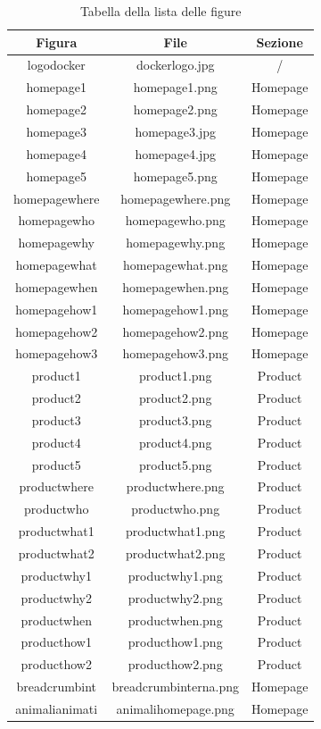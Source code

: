 \documentclass[a4paper]{article}
\begin{document}
\begin{table}[H]
\centering
\begin{tabular}{||c|c|c||}
\hline
Figura & File & Sezione \\ [0.5ex]
\hline \hline
logodocker & dockerlogo.jpg & / \\

homepage1 & homepage1.png & Homepage \\
homepage2 & homepage2.png & Homepage \\
homepage3 & homepage3.jpg & Homepage \\
homepage4 & homepage4.jpg & Homepage \\
homepage5 & homepage5.png & Homepage \\

homepagewhere & homepagewhere.png & Homepage \\
homepagewho & homepagewho.png & Homepage \\
homepagewhy & homepagewhy.png & Homepage \\
homepagewhat & homepagewhat.png & Homepage \\
homepagewhen & homepagewhen.png & Homepage\\
homepagehow1 & homepagehow1.png & Homepage \\
homepagehow2 & homepagehow2.png & Homepage \\
homepagehow3 & homepagehow3.png & Homepage \\

product1 & product1.png & Product \\
product2 & product2.png & Product \\
product3 & product3.png & Product \\
product4 & product4.png & Product \\
product5 & product5.png & Product \\

productwhere & productwhere.png & Product \\
productwho & productwho.png & Product \\
productwhat1 & productwhat1.png & Product \\
productwhat2 & productwhat2.png & Product \\
productwhy1 & productwhy1.png & Product \\
productwhy2 & productwhy2.png & Product \\
productwhen & productwhen.png & Product \\
producthow1 & producthow1.png & Product \\
producthow2 & producthow2.png & Product \\

breadcrumbint & breadcrumbinterna.png & Homepage \\
animalianimati & animalihomepage.png & Homepage \\
\hline
\end{tabular}
\caption{Tabella della lista delle figure}
\end{table}
\end{document}
